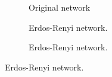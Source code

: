 \begin{figure}
\begin{subfigure}{0.45\textwidth}
{            }
            \caption{Original network}
            \label{diff_sir_greater}
        \end{subfigure}
        \begin{subfigure}{0.45\textwidth}
            \caption{Erdos-Renyi network.}
            \label{diff_sir_er_smaller}
        \end{subfigure}
        \begin{subfigure}{0.45\textwidth}
            \caption{Erdos-Renyi network.}

\end{subfigure}
\end{figure}

